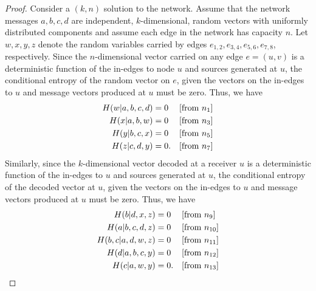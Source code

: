 \documentclass[10pt,journal]{IEEEtran}
\begin{document}
\begin{proof}
Consider a $(k,n)$ solution to the \Vamos{} network.
Assume that the network messages $a,b,c,d$ are
independent,
$k$-dimensional,
random vectors
with uniformly distributed components
and assume each edge in the network has capacity $n$.
Let $w,x,y,z$ denote the random variables carried by edges
$e_{1,2},e_{3,4},e_{5,6},e_{7,8}$, respectively.
%
Since the $n$-dimensional vector carried on any edge $e=(u,v)$ is a deterministic function
of the in-edges to node $u$ and sources generated at $u$,
the conditional entropy of the random vector on $e$,
given the vectors on the in-edges to $u$ and message vectors produced at $u$
must be zero.
Thus, we have
%
\begin{align}
H(w|a,b,c,d)           &= 0 & & [\mbox{from $n_1$}]     \label{eq:72} \\
H(x|a,b,w)             &= 0 & & [\mbox{from $n_3$}]     \label{eq:70} \\
H(y|b,c,x)             &= 0 & & [\mbox{from $n_5$}]     \label{eq:60} \\
H(z|c,d,y)             &= 0.& & [\mbox{from $n_7$}]     \label{eq:68}
\end{align}
%
Similarly,
since the $k$-dimensional vector decoded at a receiver $u$ is a deterministic function
of the in-edges to $u$ and sources generated at $u$,
the conditional entropy of the decoded vector at $u$,
given the vectors on the in-edges to $u$ and message vectors produced at $u$
must be zero.
Thus, we have
%
\begin{align}
H(b|d,x,z)             &= 0 & & [\mbox{from $n_9$}]     \label{eq:67}\\
H(a|b,c,d,z)           &= 0 & & [\mbox{from $n_{10}$}]  \label{eq:66} \\
H(b,c|a,d,w,z)         &= 0 & & [\mbox{from $n_{11}$}]  \label{eq:65} \\
H(d|a,b,c,y)           &= 0 & & [\mbox{from $n_{12}$}]  \label{eq:69} \\
H(c|a,w,y)             &= 0.& & [\mbox{from $n_{13}$}]  \label{eq:71}
\end{align}
%


\end{proof}
\end{document}
